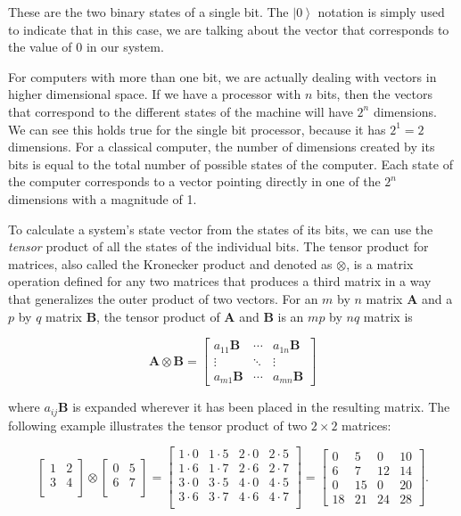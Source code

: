 \documentclass[11pt]{report}
\newcommand{\?}{\stackrel{?}{=}}
\begin{document}
These are the two binary states of a single bit. The $\left | 0 \right \rangle$ notation is simply used to indicate that in this case, we are talking about the vector that corresponds to the value of 0 in our system. 

For computers with more than one bit, we are actually dealing with vectors in higher dimensional space. If we have a processor with $n$ bits, then the vectors that correspond to the different states of the machine will have $2^n$ dimensions. We can see this holds true for the single bit processor, because it has $2^1=2$ dimensions. For a classical computer, the number of dimensions created by its bits is equal to the total number of possible states of the computer. Each state of the computer corresponds to a vector pointing directly in one of the $2^n$ dimensions with a magnitude of 1.

To calculate a system's state vector from the states of its bits, we can use the \textit{tensor} product of all the states of the individual bits. The tensor product for matrices, also called the Kronecker product and denoted as $\otimes$, is a matrix operation defined for any two matrices that produces a third matrix in a way that generalizes the outer product of two vectors. For an $m$ by $n$ matrix $\mathbf{A}$ and a $p$ by $q$ matrix $\mathbf{B}$, the tensor product of $\mathbf{A}$ and $\mathbf{B}$ is an $mp$ by $nq$ matrix is

$$\mathbf{A}\otimes\mathbf{B} = \begin{bmatrix} a_{11} \mathbf{B} & \cdots & a_{1n}\mathbf{B} \\ \vdots & \ddots & \vdots \\ a_{m1} \mathbf{B} & \cdots & a_{mn} \mathbf{B} \end{bmatrix}$$

where $a_{ij}\mathbf{B}$ is expanded wherever it has been placed in the resulting matrix. The following example illustrates the tensor product of two $2\times2$ matrices:

$$
  \begin{bmatrix}
    1 & 2 \\
    3 & 4 \\
  \end{bmatrix}
\otimes
  \begin{bmatrix}
    0 & 5 \\
    6 & 7 \\
  \end{bmatrix}
=
  \begin{bmatrix}
    1\cdot 0 & 1\cdot 5 & 2\cdot 0 & 2\cdot 5 \\
    1\cdot 6 & 1\cdot 7 & 2\cdot 6 & 2\cdot 7 \\
    3\cdot 0 & 3\cdot 5 & 4\cdot 0 & 4\cdot 5 \\
    3\cdot 6 & 3\cdot 7 & 4\cdot 6 & 4\cdot 7 \\
  \end{bmatrix}
=
  \begin{bmatrix}
    0 & 5 & 0 & 10 \\
    6 & 7 & 12 & 14 \\
    0 & 15 & 0 & 20 \\
    18 & 21 & 24 & 28
  \end{bmatrix}.
$$
\end{document}

